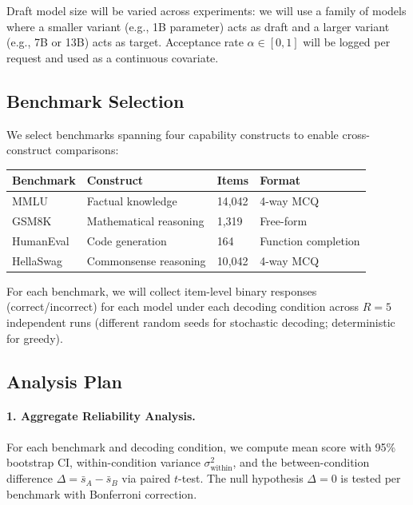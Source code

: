 \documentclass{article}
\begin{document}
Draft model size will be varied across experiments: we will use a family of models where a smaller variant (e.g., 1B parameter) acts as draft and a larger variant (e.g., 7B or 13B) acts as target. Acceptance rate $\alpha \in [0, 1]$ will be logged per request and used as a continuous covariate.

\subsection{Benchmark Selection}

We select benchmarks spanning four capability constructs to enable cross-construct comparisons:

\begin{center}
\begin{tabular}{llll}
\toprule
\textbf{Benchmark} & \textbf{Construct} & \textbf{Items} & \textbf{Format} \\
\midrule
MMLU~\citep{hendrycks2020measuring} & Factual knowledge & 14{,}042 & 4-way MCQ \\
GSM8K~\citep{cobbe2021training} & Mathematical reasoning & 1{,}319 & Free-form \\
HumanEval~\citep{chen2021evaluating} & Code generation & 164 & Function completion \\
HellaSwag~\citep{zellers2019hellaswag} & Commonsense reasoning & 10{,}042 & 4-way MCQ \\
\bottomrule
\end{tabular}
\end{center}

For each benchmark, we will collect item-level binary responses (correct/incorrect) for each model under each decoding condition across $R = 5$ independent runs (different random seeds for stochastic decoding; deterministic for greedy).

\subsection{Analysis Plan}

\paragraph{1. Aggregate Reliability Analysis.}
For each benchmark and decoding condition, we compute mean score with 95\% bootstrap CI, within-condition variance $\sigma^2_{\text{within}}$, and the between-condition difference $\Delta = \bar{s}_A - \bar{s}_B$ via paired $t$-test. The null hypothesis $\Delta = 0$ is tested per benchmark with Bonferroni correction.
\end{document}
